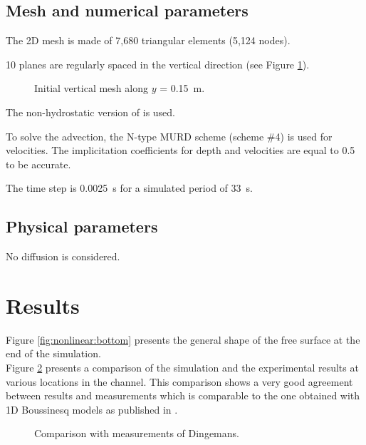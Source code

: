 \subsection{Mesh and numerical parameters}

The 2D mesh is made of 7,680 triangular elements (5,124 nodes).

10 planes are regularly spaced in the vertical direction
(see Figure \ref{t3d:nonlinear:fig:meshV}).

\begin{figure}[!htbp]
 \centering
 \caption{Initial vertical mesh along $y$ = 0.15~m.}
 \label{t3d:nonlinear:fig:meshV}
\end{figure}

The non-hydrostatic version of  is used.

To solve the advection, the N-type MURD scheme (scheme \#4) is used for velocities.
The implicitation coefficients for depth and velocities are equal to 0.5 to be
accurate.

The time step is 0.0025~s for a simulated period of 33~s.

\subsection{Physical parameters}

No diffusion is considered.

\section{Results}

Figure \ref{fig:nonlinear:bottom} presents the general shape of the free surface at the end
of the simulation.\\
Figure \ref{fig:nonlinear:measure} presents a comparison of the \tel simulation and the
experimental results at various locations in the channel.
This comparison shows a very good agreement between results and
measurements which is comparable to the one obtained with 1D Boussinesq
models as published in \cite{Benoit2001}.

\begin{figure}[H]
 \centering
{}
\caption{Comparison with measurements of Dingemans.}\label{fig:nonlinear:measure}
\end{figure}

